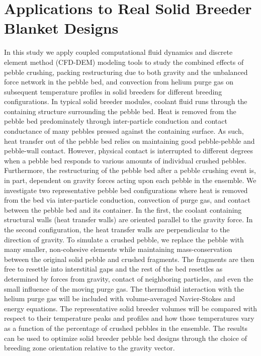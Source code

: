 \chapter{Applications to Real Solid Breeder Blanket Designs}\label{sec:applied-studies}

In this study we apply coupled computational fluid dynamics and discrete element method (CFD-DEM) modeling tools to study the combined effects of pebble crushing, packing restructuring due to both gravity and the unbalanced force network in the pebble bed, and convection from helium purge gas on subsequent temperature profiles in solid breeders for different breeding configurations. In typical solid breeder modules, coolant fluid runs through the containing structure surrounding the pebble bed. Heat is removed from the pebble bed predominately through inter-particle conduction and contact conductance of many pebbles pressed against the containing surface. As such, heat transfer out of the pebble bed relies on maintaining good pebble-pebble and pebble-wall contact. However, physical contact is interrupted to different degrees when a pebble bed responds to various amounts of individual crushed pebbles. Furthermore, the restructuring of the pebble bed after a pebble crushing event is, in part, dependent on gravity forces acting upon each pebble in the ensemble. We investigate two representative pebble bed configurations where heat is removed from the bed via inter-particle conduction, convection of purge gas, and contact between the pebble bed and its container. In the first, the coolant containing structural walls (heat transfer walls) are oriented parallel to the gravity force. In the second configuration, the heat transfer walls are perpendicular to the direction of gravity. To simulate a crushed pebble, we replace the pebble with many smaller, non-cohesive elements while maintaining mass-conservation between the original solid pebble and crushed fragments. The fragments are then free to resettle into interstitial gaps and the rest of the bed resettles as determined by forces from gravity, contact of neighboring particles, and even the small influence of the moving purge gas. The thermofluid interaction with the helium purge gas will be included with volume-averaged Navier-Stokes and energy equations. The representative solid breeder volumes will be compared with respect to their temperature peaks and profiles and how those temperatures vary as a function of the percentage of crushed pebbles in the ensemble. The results can be used to optimize solid breeder pebble bed designs through the choice of breeding zone orientation relative to the gravity vector.